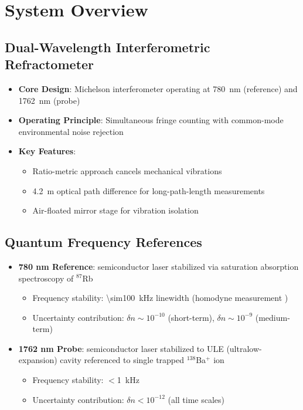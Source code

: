 \documentclass[aip,reprint,groupedaddress,onecolumn,superscriptaddress]{revtex4-2}
\begin{document}
\section{System Overview}

\subsection{Dual-Wavelength Interferometric Refractometer}
\begin{itemize}
    \item \textbf{Core Design}: Michelson interferometer operating at \SI{780}{\nano\meter} (reference) and \SI{1762}{\nano\meter} (probe)
    \item \textbf{Operating Principle}: Simultaneous fringe counting with common-mode environmental noise rejection
    \item \textbf{Key Features}:
    \begin{itemize}
        \item Ratio-metric approach cancels mechanical vibrations
        \item \SI{4.2}{\meter} optical path difference for long-path-length measurements %
        \item Air-floated mirror stage for vibration isolation
    \end{itemize}
\end{itemize}

\subsection{Quantum Frequency References}
\begin{itemize}
    \item \textbf{780 nm Reference}: semiconductor laser stabilized via saturation absorption spectroscopy of $^{87}$Rb
    \begin{itemize}
        \item Frequency stability: \SI{\sim100}{\kilo\hertz} linewidth (homodyne measurement \cite{ludvigsen1998laser})
        \item Uncertainty contribution: $\delta n \sim 10^{-10}$ (short-term), $\delta n \sim 10^{-9}$ (medium-term)
    \end{itemize}
    
    \item \textbf{1762 nm Probe}: semiconductor laser stabilized to ULE (ultralow-expansion) cavity referenced to single trapped $^{138}$Ba$^+$ ion
    \begin{itemize}
        \item Frequency stability: $<$\SI{1}{\kilo\hertz}
        \item Uncertainty contribution: $\delta n < 10^{-12}$ (all time scales)
    \end{itemize}
\end{itemize}
\end{document}
